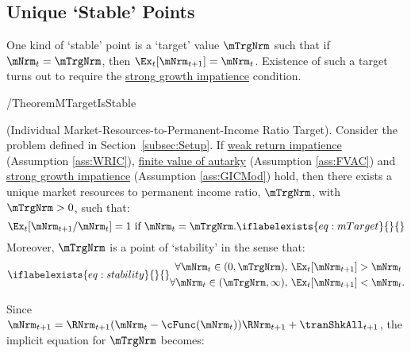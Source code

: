 \documentclass[BufferStockTheory]{subfiles}
\begin{document}
\hypertarget{onetarget}{}
\hypertarget{Unique-Stable-Points}{}

\subsection{Unique `Stable' Points}\label{subsec:onetarget}\hypertarget{TheoremTarget}{}

One kind of `stable' point is a `target' value $\mTrgNrm$ such that if $\mNrm_{t}=\mTrgNrm$, then $\Ex_{t}[\mNrm_{t+1}]=\mNrm_{t}$.  Existence of such a target turns out to require the \hyperlink{GICMod}{strong growth impatience} condition.

\begin{verbatimwrite}{\EqDir/TheoremMTargetIsStable}
  \begin{theorem} (Individual Market-Resources-to-Permanent-Income Ratio Target). %
    Consider the problem defined in Section~\ref{subsec:Setup}. If \hyperlink{WRIC}{weak return impatience} (Assumption \ref{ass:WRIC}), \hyperlink{FVAC}{finite value of autarky} (Assumption \ref{ass:FVAC}) and \hyperlink{GICMod}{strong growth impatience} (Assumption \ref{ass:GICMod}) hold, then there exists a unique market resources to permanent income ratio, $\mTrgNrm$, with $\mTrgNrm>0$, such that:
    \begin{equation}
      \Ex_t [{\mNrm}_{t+1}/\mNrm_t] = 1 \mbox{~if~} \mNrm_t = \mTrgNrm.
      \iflabelexists{eq:mTarget}{}{\label{eq:mTarget}} %
    \end{equation}
    Moreover, $\mTrgNrm$ is a point of `stability' in the sense that:
    \begin{equation}
      \iflabelexists{eq:stability}{}{\label{eq:stability}} %
      \begin{split}
        \forall {\mNrm}_t\in(0,\mTrgNrm),      \,\,& \Ex_t [{\mNrm}_{t+1}] > {\mNrm}_t  \\
        \forall {\mNrm}_t\in(\mTrgNrm,\infty), \,\,& \Ex_t [{\mNrm}_{t+1}] < {\mNrm}_t.
      \end{split}
    \end{equation}
  \end{theorem}
\end{verbatimwrite}




\hypertarget{mTargImplicit}{}
Since $\mNrm_{t+1}=\RNrm_{t+1}(\mNrm_{t}-\cFunc(\mNrm_{t}))\RNrm_{t+1}+\tranShkAll_{t+1}$, the implicit equation for $\mTrgNrm$ becomes:
\end{document}
